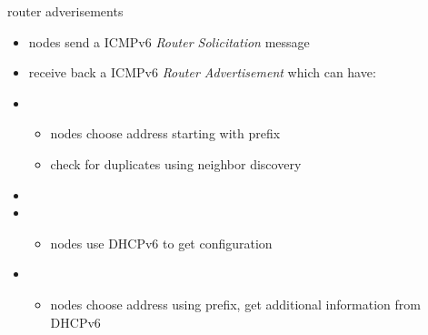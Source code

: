 \begin{frame}{router adverisements}
\begin{itemize}
\item nodes send a ICMPv6 \textit{Router Solicitation} message
\item receive back a ICMPv6 \textit{Router Advertisement} which can have:
\vspace{.5cm}
\item {}
    \begin{itemize}
    \item nodes choose address starting with prefix
    \item check for duplicates using neighbor discovery
    \end{itemize}
\item {}
\item {}
    \begin{itemize}
    \item nodes use DHCPv6 to get configuration
    \end{itemize}
\item {}
    \begin{itemize}
    \item nodes choose address using prefix, get additional information from DHCPv6
    \end{itemize}
\end{itemize}
\end{frame}
